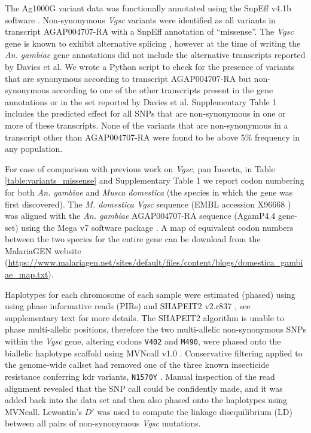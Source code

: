 \documentclass[a4paper,11pt,abstracton,hidelinks]{scrartcl}
\begin{document}
%
The Ag1000G variant data was functionally annotated using the SnpEff v4.1b software \cite{Cingolani2012}.
%
Non-synonymous \emph{Vgsc} variants were identified as all variants in transcript AGAP004707-RA with a SnpEff annotation of ``missense''.
%
The \emph{Vgsc} gene is known to exhibit alternative splicing \cite{Davies2007a}, however at the time of writing the \textit{An. gambiae} gene annotations did not include the alternative transcripts reported by Davies et al.
%
We wrote a Python script to check for the presence of variants that are synonymous according to transcript AGAP004707-RA but non-synonymous according to one of the other transcripts present in the gene annotations or in the set reported by Davies et al.
%
Supplementary Table 1 includes the predicted effect for all SNPs that are non-synonymous in one or more of these transcripts.
%
None of the variants that are non-synonymous in a transcript other than AGAP004707-RA were found to be above 5\% frequency in any population.
%

%
For ease of comparison with previous work on \emph{Vgsc}, pan Insecta, in Table \ref{table:variants_missense} and Supplementary Table 1 we report codon numbering for both \emph{An. gambiae} and \emph{Musca domestica} (the species in which the gene was first discovered).
%
The \emph{M. domestica Vgsc} sequence (EMBL accession X96668 \cite{Williamson1996}) was aligned with the \emph{An. gambiae} AGAP004707-RA sequence (AgamP4.4 gene-set) using the Mega v7 software package \cite{Kumar2016}.
%
A map of equivalent codon numbers between the two species for the entire gene can be download from the MalariaGEN website (\url{https://www.malariagen.net/sites/default/files/content/blogs/domestica_gambiae_map.txt}).

%
Haplotypes for each chromosome of each sample were estimated (phased) using using phase informative reads (PIRs) and SHAPEIT2 v2.r837 \cite{Delaneau2013}, see \cite{Ag1000gConsortium2017} supplementary text for more details.
%
The SHAPEIT2 algorithm is unable to phase multi-allelic positions, therefore the two multi-allelic non-synonymous SNPs within the \emph{Vgsc} gene, altering codons \texttt{V402} and \texttt{M490}, were phased onto the biallelic haplotype scaffold using MVNcall v1.0 \cite{Menelaou2013}.
%
Conservative filtering applied to the genome-wide callset had removed one of the three known insecticide resistance conferring kdr variants, \texttt{N1570Y} \cite{Jones2012}.
%
Manual inspection of the read alignment revealed that the SNP call could be confidently made, and it was added back into the data set and then also phased onto the haplotypes using MVNcall.
%
Lewontin's $D'$ \cite{Lewontin1964} was used to compute the linkage disequilibrium (LD) between all pairs of non-synonymous \emph{Vgsc} mutations.
\end{document}
